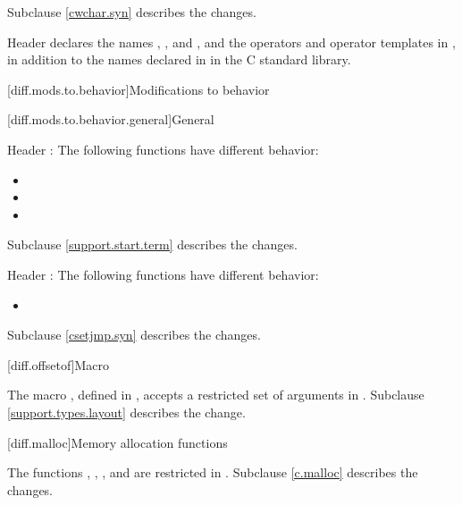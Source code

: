 Subclause \ref{cwchar.syn} describes the changes.

\pnum
Header 
declares the names , , and ,
and the operators and operator templates in ,
in addition to the names declared in
 in the C standard library.

[diff.mods.to.behavior]{Modifications to behavior}

[diff.mods.to.behavior.general]{General}

\pnum
Header :
The following functions have different behavior:
\begin{itemize}
\item {}
\item {}
\item {}
\end{itemize}

Subclause \ref{support.start.term} describes the changes.

\pnum
Header :
The following functions have different behavior:
\begin{itemize}
\item {}
\end{itemize}

Subclause \ref{csetjmp.syn} describes the changes.

[diff.offsetof]{Macro }
%

\pnum
The macro , defined in
,
accepts a restricted set of  arguments in \Cpp{}.
Subclause \ref{support.types.layout} describes the change.

[diff.malloc]{Memory allocation functions}

\pnum
The functions
,
,
,
and
are restricted in \Cpp{}.
Subclause \ref{c.malloc} describes the changes.

